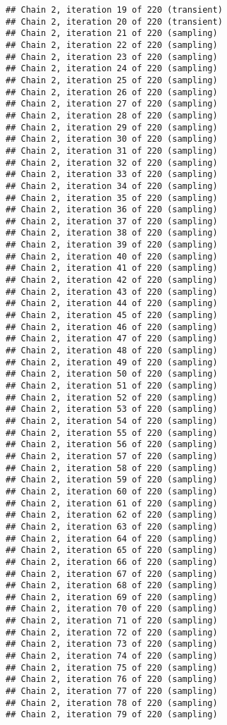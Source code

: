 \documentclass[]{book}
\begin{document}
\begin{verbatim}
## Chain 2, iteration 19 of 220 (transient)
## Chain 2, iteration 20 of 220 (transient)
## Chain 2, iteration 21 of 220 (sampling)
## Chain 2, iteration 22 of 220 (sampling)
## Chain 2, iteration 23 of 220 (sampling)
## Chain 2, iteration 24 of 220 (sampling)
## Chain 2, iteration 25 of 220 (sampling)
## Chain 2, iteration 26 of 220 (sampling)
## Chain 2, iteration 27 of 220 (sampling)
## Chain 2, iteration 28 of 220 (sampling)
## Chain 2, iteration 29 of 220 (sampling)
## Chain 2, iteration 30 of 220 (sampling)
## Chain 2, iteration 31 of 220 (sampling)
## Chain 2, iteration 32 of 220 (sampling)
## Chain 2, iteration 33 of 220 (sampling)
## Chain 2, iteration 34 of 220 (sampling)
## Chain 2, iteration 35 of 220 (sampling)
## Chain 2, iteration 36 of 220 (sampling)
## Chain 2, iteration 37 of 220 (sampling)
## Chain 2, iteration 38 of 220 (sampling)
## Chain 2, iteration 39 of 220 (sampling)
## Chain 2, iteration 40 of 220 (sampling)
## Chain 2, iteration 41 of 220 (sampling)
## Chain 2, iteration 42 of 220 (sampling)
## Chain 2, iteration 43 of 220 (sampling)
## Chain 2, iteration 44 of 220 (sampling)
## Chain 2, iteration 45 of 220 (sampling)
## Chain 2, iteration 46 of 220 (sampling)
## Chain 2, iteration 47 of 220 (sampling)
## Chain 2, iteration 48 of 220 (sampling)
## Chain 2, iteration 49 of 220 (sampling)
## Chain 2, iteration 50 of 220 (sampling)
## Chain 2, iteration 51 of 220 (sampling)
## Chain 2, iteration 52 of 220 (sampling)
## Chain 2, iteration 53 of 220 (sampling)
## Chain 2, iteration 54 of 220 (sampling)
## Chain 2, iteration 55 of 220 (sampling)
## Chain 2, iteration 56 of 220 (sampling)
## Chain 2, iteration 57 of 220 (sampling)
## Chain 2, iteration 58 of 220 (sampling)
## Chain 2, iteration 59 of 220 (sampling)
## Chain 2, iteration 60 of 220 (sampling)
## Chain 2, iteration 61 of 220 (sampling)
## Chain 2, iteration 62 of 220 (sampling)
## Chain 2, iteration 63 of 220 (sampling)
## Chain 2, iteration 64 of 220 (sampling)
## Chain 2, iteration 65 of 220 (sampling)
## Chain 2, iteration 66 of 220 (sampling)
## Chain 2, iteration 67 of 220 (sampling)
## Chain 2, iteration 68 of 220 (sampling)
## Chain 2, iteration 69 of 220 (sampling)
## Chain 2, iteration 70 of 220 (sampling)
## Chain 2, iteration 71 of 220 (sampling)
## Chain 2, iteration 72 of 220 (sampling)
## Chain 2, iteration 73 of 220 (sampling)
## Chain 2, iteration 74 of 220 (sampling)
## Chain 2, iteration 75 of 220 (sampling)
## Chain 2, iteration 76 of 220 (sampling)
## Chain 2, iteration 77 of 220 (sampling)
## Chain 2, iteration 78 of 220 (sampling)
## Chain 2, iteration 79 of 220 (sampling)

\end{verbatim}
\end{document}
